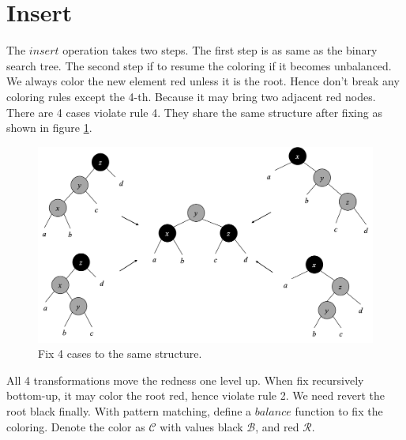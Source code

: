 \documentclass[b5paper]{article}
\begin{document}
\section{Insert}

The $insert$ operation takes two steps. The first step is as same as the binary search tree. The second step if to resume the coloring if it becomes unbalanced. We always color the new element red unless it is the root. Hence don't break any coloring rules except the 4-th. Because it may bring two adjacent red nodes. There are 4 cases violate rule 4. They share the same structure after fixing\cite{okasaki} as shown in figure \cref{fig:insert-fix}.

\begin{figure}[htbp]
  \centering
  \includegraphics[scale=0.4]{img/insert-fix}
  \caption{Fix 4 cases to the same structure.}
  \label{fig:insert-fix}
\end{figure}

All 4 transformations move the redness one level up. When fix recursively bottom-up, it may color the root red, hence violate rule 2. We need revert the root black finally. With pattern matching, define a $balance$ function to fix the coloring. Denote the color as $\mathcal{C}$ with values black $\mathcal{B}$, and red $\mathcal{R}$.
\end{document}
